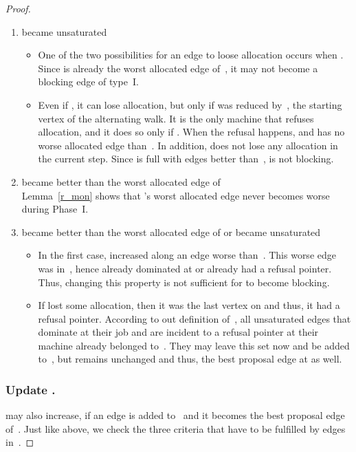 \documentclass{llncs}
\begin{document}
\begin{proof}
\begin{enumerate}
	\item  became unsaturated
		\begin{itemize}
 			\item One of the two possibilities for an edge to loose allocation occurs when . Since  is already the worst allocated edge of~, it may not become a blocking edge of type~I.
			\item Even if , it can lose allocation, but only if  was reduced by~, the starting vertex of the alternating walk. It is the only machine that refuses allocation, and it does so only if . When the refusal happens,  and  has no worse allocated edge than~. In addition,  does not lose any allocation in the current step. Since  is full with edges better than~,  is not blocking.
		\end{itemize}
	\item  became better than the worst allocated edge of \\ Lemma~\ref{r_mon} shows that 's worst allocated edge never becomes worse during Phase~I.
 	\item  became better than the worst allocated edge of  or  became unsaturated
		\begin{itemize}
			\item In the first case,  increased  along an edge worse than~. This worse edge was in~, hence  already dominated  at  or  already had a refusal pointer. Thus, changing this property is not sufficient for  to become blocking.
			\item If  lost some allocation, then it was the last vertex on  and thus, it had a refusal pointer. According to out definition of~, all unsaturated edges that dominate  at their job and are incident to a refusal pointer at their machine already belonged to~. They may leave this set now and be added to~, but  remains unchanged and thus, the best proposal edge at  as well.
		\end{itemize}
\end{enumerate}

\subsubsection*{Update .}

 may also increase, if an edge  is added to~ and it becomes the best proposal edge of~. Just like above, we check the three criteria that have to be fulfilled by edges in~.


\end{proof}
\end{document}
